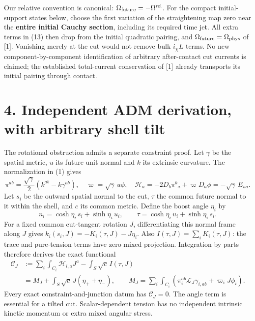 \documentclass[
  10pt,
]{article}
\begin{document}
Our relative convention is canonical:
\(\Omega_{\rm future}=-\Omega^{\rm rel}\). For the compact
initial-support states below, choose the first variation of the
straightening map zero near the \textbf{entire initial Cauchy section},
including its required time jet. All extra terms in (13) then drop from
the initial quadratic pairing, and
\(\Omega_{\rm future}=\Omega_{\rm phys}\) of {[}1{]}. Vanishing merely
at the cut would not remove bulk \(i_\chi L\) terms. No new
component-by-component identification of arbitrary after-contact cut
currents is claimed; the established total-current conservation of
{[}1{]} already transports its initial pairing through contact.

\section{4. Independent ADM derivation, with arbitrary shell
tilt}\label{independent-adm-derivation-with-arbitrary-shell-tilt}

The rotational obstruction admits a separate constraint proof. Let
\(\gamma\) be the spatial metric, \(u\) its future unit normal and \(k\)
its extrinsic curvature. The normalization in (1) gives \[
 \pi^{ab}=\frac{\sqrt\gamma}{2}(k^{ab}-k\gamma^{ab}),\quad
 \varpi=\sqrt\gamma\,u\phi,\quad
 \mathcal H_a=-2D_b\pi^b{}_a+\varpi D_a\phi
             =-\sqrt\gamma\,E_{ua}.                     \tag{16}
\] Let \(s_i\) be the outward spatial normal to the cut, \(\tau\) the
common future normal to it within the shell, and \(c\) its common
metric. Define the boost angle \(\eta_i\) by \[
 n_i=\cosh\eta_i\,s_i+\sinh\eta_i\,u_i,
 \qquad\tau=\cosh\eta_i\,u_i+\sinh\eta_i\,s_i .         \tag{17}
\] For a fixed common cut-tangent rotation \(J\), differentiating this
normal frame along \(J\) gives \(k_i(s_i,J)=-K_i(\tau,J)-J\eta_i\). Also
\(I(\tau,J)=\sum_iK_i(\tau,J)\): the trace and pure-tension terms have
zero mixed projection. Integration by parts therefore derives the exact
functional \[
 \begin{aligned}
 \mathcal C_J
 &:=\sum_i\int_{C_i}\mathcal H_{i,a}J^a
        -\int_S\sqrt c\,I(\tau,J)\\
 &=M_J+\int_S\sqrt c\,J(\eta_++\eta_-),\qquad
 M_J=\sum_i\int_{C_i}
       (\pi_i^{ab}\mathcal L_J\gamma_{i,ab}+\varpi_iJ\phi_i).
 \end{aligned}                                           \tag{18}
\] Every exact constraint-and-junction datum has \(\mathcal C_J=0\). The
angle term is essential for a tilted cut. Scalar-dependent tension has
no independent intrinsic kinetic momentum or extra mixed angular stress.
\end{document}
